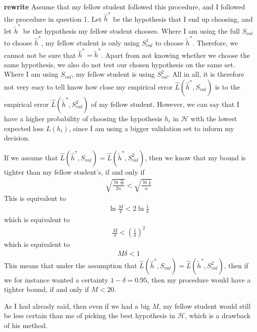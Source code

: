 \textbf{rewrite}
Assume that my fellow student followed this procedure, and I followed the procedure in question 1. Let $\hat{h}^*$ be the hypothesis that I end up choosing, and let $\tilde{h}^*$ be the hypothesis my fellow student chooses. Where I am using the full $S_{val}$ to choose $\hat{h}^*$, my fellow student is only using $S^1_{val}$ to choose $\tilde{h}^*$. Therefore, we cannot not be sure that $\hat{h}^* = \tilde{h}^*$. Apart from not knowing whether we choose the same hypothesis, we also do not test our chosen hypothesis on the same set. Where I am using $S_{val}$, my fellow student is using $S_{val}^2$. All in all, it is therefore not very easy to tell know how close my empirical error $\hat{L}(\hat{h}^*,S_{val})$ is to the empirical error $\hat{L}(\tilde{h}^*,S_{val}^2)$ of my fellow student. However, we can say that I have a higher probability of choosing the hypothesis $h_i$ in $\mathcal{H}$ with the lowest expected loss $L(h_i)$, since I am using a bigger validation set to inform my decision.

If we assume that $\hat{L}(\hat{h}^*,S_{val}) = \hat{L}(\tilde{h}^*,S_{val}^2)$, then we know that my bound is tighter than my fellow student's, if and only if
\begin{align}
\sqrt{\frac{\ln \frac{M}{\delta}}{2n}} < \sqrt{\frac{ \ln \frac{1}{\delta}}{n}} 
\end{align}
This is equivalent to
\begin{align}
\ln \frac{M}{\delta} < 2 \ln \frac{1}{\delta}
\end{align}
which is equivalent to
\begin{align}
\frac{M}{\delta} < \left( \frac{1}{\delta} \right)^2
\end{align}
which is equivalent to
\begin{align}
M \delta < 1
\end{align}
This means that under the assumption that $\hat{L}(\hat{h}^*,S_{val}) = \hat{L}(\tilde{h}^*,S_{val}^2)$, then if we for instance wanted a certainty $1-\delta = 0.95$, then my procedure would have a tighter bound, if and only if $M < 20$. 

As I had already said, then even if we had a big $M$, my fellow student would still be less certain than me of picking the best hypothesis in $\mathcal{H}$, which is a drawback of his method.




